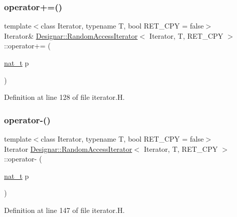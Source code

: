 \subsubsection{\texorpdfstring{operator+=()}{operator+=()}}
{\footnotesize\ttfamily template$<$class Iterator, typename T, bool R\+E\+T\+\_\+\+C\+PY = false$>$ \\
Iterator\& \hyperlink{class_designar_1_1_random_access_iterator}{Designar\+::\+Random\+Access\+Iterator}$<$ Iterator, T, R\+E\+T\+\_\+\+C\+PY $>$\+::operator+= (\begin{DoxyParamCaption}\item[{\hyperlink{namespace_designar_aa72662848b9f4815e7bf31a7cf3e33d1}{nat\+\_\+t}}]{p }\end{DoxyParamCaption})\hspace{0.3cm}{\ttfamily [inline]}}



Definition at line 128 of file iterator.\+H.

\mbox{\label{class_designar_1_1_random_access_iterator_ab59d5341ccba07c66bf2f6a904d5a6c1}} 
\subsubsection{\texorpdfstring{operator-\/()}{operator-()}}
{\footnotesize\ttfamily template$<$class Iterator, typename T, bool R\+E\+T\+\_\+\+C\+PY = false$>$ \\
Iterator \hyperlink{class_designar_1_1_random_access_iterator}{Designar\+::\+Random\+Access\+Iterator}$<$ Iterator, T, R\+E\+T\+\_\+\+C\+PY $>$\+::operator-\/ (\begin{DoxyParamCaption}\item[{\hyperlink{namespace_designar_aa72662848b9f4815e7bf31a7cf3e33d1}{nat\+\_\+t}}]{p }\end{DoxyParamCaption})\hspace{0.3cm}{\ttfamily [inline]}}



Definition at line 147 of file iterator.\+H.

\mbox{\label{class_designar_1_1_random_access_iterator_ac7ede306e0004e8c178059ede8e239ba}} 
